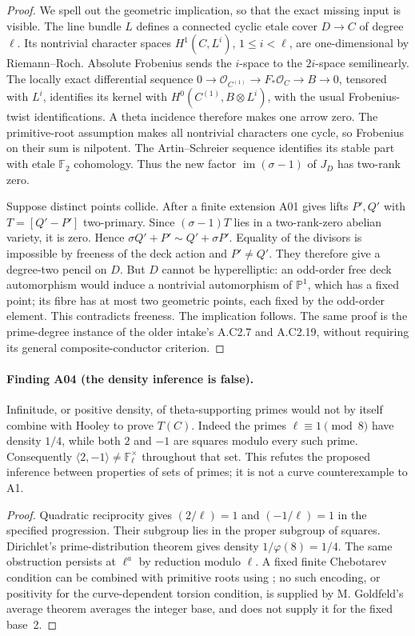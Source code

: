 \begin{proof}
We spell out the geometric implication, so that the exact missing input
is visible. The line bundle $L$ defines a connected cyclic etale cover
$D\to C$ of degree $\ell$. Its nontrivial character spaces
$H^1(C,L^i)$, $1\le i<\ell$, are one-dimensional by Riemann--Roch.
Absolute Frobenius sends the $i$-space to the $2i$-space semilinearly.
The locally exact differential sequence
$0\to\mathcal O_{C^{(1)}}\to F_*\mathcal O_C\to B\to0$,
tensored with $L^i$, identifies its kernel with
$H^0(C^{(1)},B\otimes L^i)$, with the usual Frobenius-twist
identifications. A theta incidence therefore makes one arrow zero.
The primitive-root assumption makes all nontrivial characters one
cycle, so Frobenius on their sum is nilpotent. The Artin--Schreier
sequence identifies its stable part with etale $\mathbb F_2$
cohomology. Thus the new factor $\operatorname{im}(\sigma-1)$ of
$J_D$ has two-rank zero.

Suppose distinct points collide. After a finite extension A01 gives
lifts $P',Q'$ with $T=[Q'-P']$ two-primary. Since
$(\sigma-1)T$ lies in a two-rank-zero abelian variety, it is zero.
Hence $\sigma Q'+P'\sim Q'+\sigma P'$. Equality of the divisors
is impossible by freeness of the deck action and $P'\ne Q'$.
They therefore give a degree-two pencil on $D$. But $D$ cannot be
hyperelliptic: an odd-order free deck automorphism would induce a
nontrivial automorphism of $\mathbb P^1$, which has a fixed point;
its fibre has at most two geometric points, each fixed by the
odd-order element. This contradicts freeness. The implication follows.
The same proof is the prime-degree instance of the older intake's
A.C2.7 and A.C2.19, without requiring its general composite-conductor
criterion.
\end{proof}

\paragraph{Finding A04 (the density inference is false).}
Infinitude, or positive density, of theta-supporting primes would not
by itself combine with Hooley to prove $T(C)$. Indeed the primes
$\ell\equiv1\pmod8$ have density $1/4$, while both $2$ and $-1$
are squares modulo every such prime. Consequently
$\langle2,-1\rangle\ne\mathbb F_\ell^\times$ throughout that set.
This refutes the proposed inference between properties of sets of
primes; it is not a curve counterexample to A1.

\begin{proof}
Quadratic reciprocity gives $(2/\ell)=1$ and $(-1/\ell)=1$ in the
specified progression. Their subgroup lies in the proper subgroup
of squares. Dirichlet's prime-distribution theorem gives density
$1/\varphi(8)=1/4$. The same obstruction persists at $\ell^a$ by
reduction modulo $\ell$. A fixed finite Chebotarev condition can be
combined with primitive roots using \cite[Theorem~3.1, and
Theorems~4.1--4.2 for positivity]{Lenstra1977}; no such encoding,
or positivity for the curve-dependent torsion condition, is supplied
by M. Goldfeld's average theorem \cite[Theorem, p.~223]{Goldfeld}
averages the integer base, and does not supply it for the fixed base~2.
\end{proof}

